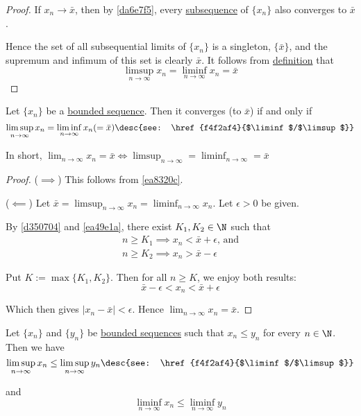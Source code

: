 \begin{proof}
  If $x_n\to\bar x$, then by \autoref{da6e7f5}, every
  \href{c6b3a49}{subsequence} of $\{x_n\}$ also converges to $\bar x$.

  Hence the set of all subsequential limits of $\{x_n\}$ is a singleton,
  $\{\bar x\}$, and the supremum and infimum of this set is clearly $\bar x$.
  It follows from \href{f4f2af4}{definition} that
  $$
    \limsup_{n\to\infty}x_n=\liminf_{n\to\infty}x_n=\bar x
  $$
\end{proof}

\label{ccbc3b1}

Let $\{x_n\}$ be a \href{d5ed299}{bounded sequence}. Then it converges (to
$\bar x$) if and only if
$$
  \limsup_{n\to\infty}x_n=\liminf_{n\to\infty}x_n(=\bar x)\desc{see: \href{f4f2af4}{$\liminf$/$\limsup$}}
$$

In short, $\displaystyle\lim_{n\to\infty}x_n=\bar x
\iff\limsup_{n\to\infty}=\liminf_{n\to\infty}=\bar x$

\begin{proof}
  ($\implies$) This follows from \autoref{ea8320c}.

  ($\impliedby$) Let $\displaystyle\bar x=
  \limsup_{n\to\infty}x_n=\liminf_{n\to\infty}x_n$. Let $\epsilon>0$ be given.

  By \autoref{d350704} and \autoref{ea49e1a}, there exist $K_1,K_2\in\N$ such
  that
  \begin{gather*}
    n\geq K_1\implies x_n<\bar x+\epsilon\text{, and} \\
    n\geq K_2\implies x_n>\bar x-\epsilon
  \end{gather*}

  Put $K:=\max\{K_1,K_2\}$. Then for all $n\geq K$, we enjoy both results:
  $$
    \bar x-\epsilon<x_n<\bar x+\epsilon
  $$

  Which then gives $|x_n-\bar x|<\epsilon$. Hence
  $\displaystyle\lim_{n\to\infty}x_n=\bar x$.
\end{proof}

\Theorem{}\label{a19e9f7}

Let $\{x_n\}$ and $\{y_n\}$ be \href{d5ed299}{bounded sequences} such that
$x_n\leq y_n$ for every $n\in\N$. Then we have
$$
  \limsup_{n\to\infty}x_n\leq \limsup_{n\to\infty}y_n\desc{see: \href{f4f2af4}{$\liminf$/$\limsup$}}
$$

and
$$
  \liminf_{n\to\infty}x_n\leq \liminf_{n\to\infty}y_n
$$

